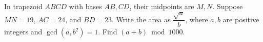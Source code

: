 In trapezoid $ABCD$ with bases $AB,CD$, their midpoints are $M,N$. Suppose $MN=19$, $AC=24$, and $BD=23$. Write the area as $\dfrac{\sqrt a}{b}$, where $a,b$ are positive integers and $\gcd(a,b^2)=1$. Find $(a+b)\bmod1000$.
